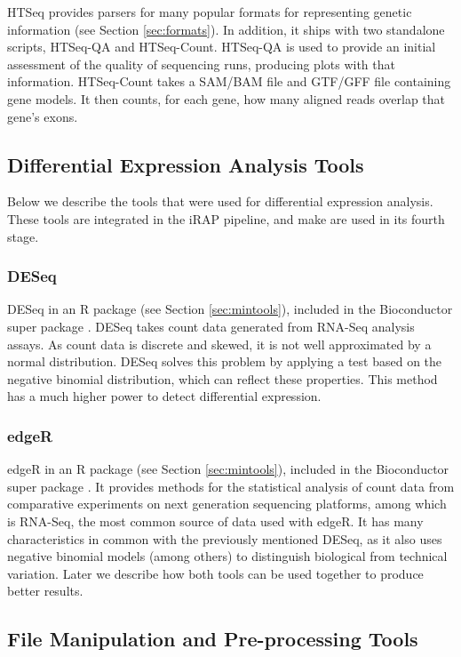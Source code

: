 HTSeq provides parsers for many popular formats for representing genetic
information (see Section \ref{sec:formats}). In addition, it ships with two
standalone scripts, HTSeq-QA and HTSeq-Count. HTSeq-QA is used to provide an
initial assessment of the quality of sequencing runs, producing plots with that
information. HTSeq-Count takes a SAM/BAM file and GTF/GFF file containing gene
models. It then counts, for each gene, how many aligned reads overlap that
gene's exons.

\subsection{Differential Expression Analysis Tools}

Below we describe the tools that were used for differential expression analysis.
These tools are integrated in the iRAP pipeline, and make are used in its fourth
stage.

\subsubsection*{DESeq}

DESeq in an R package (see Section \ref{sec:mintools}), included in the
Bioconductor super package \cite{20979621}. DESeq takes count data generated
from RNA-Seq analysis assays. As count data is discrete and skewed, it is not
well approximated by a normal distribution. DESeq solves this problem by
applying a test based on the negative binomial distribution, which can reflect
these properties. This method has a much higher power to detect differential
expression.

\subsubsection*{edgeR}

edgeR in an R package (see Section \ref{sec:mintools}), included in the
Bioconductor super package \cite{robinson2010edger}. It provides methods for the
statistical analysis of count data from comparative experiments on next
generation sequencing platforms, among which is RNA-Seq, the most common source
of data used with edgeR. It has many characteristics in common with the
previously mentioned DESeq, as it also uses negative binomial models (among
others) to distinguish biological from technical variation. Later we describe
how both tools can be used together to produce better results.

\subsection{File Manipulation and Pre-processing Tools}

